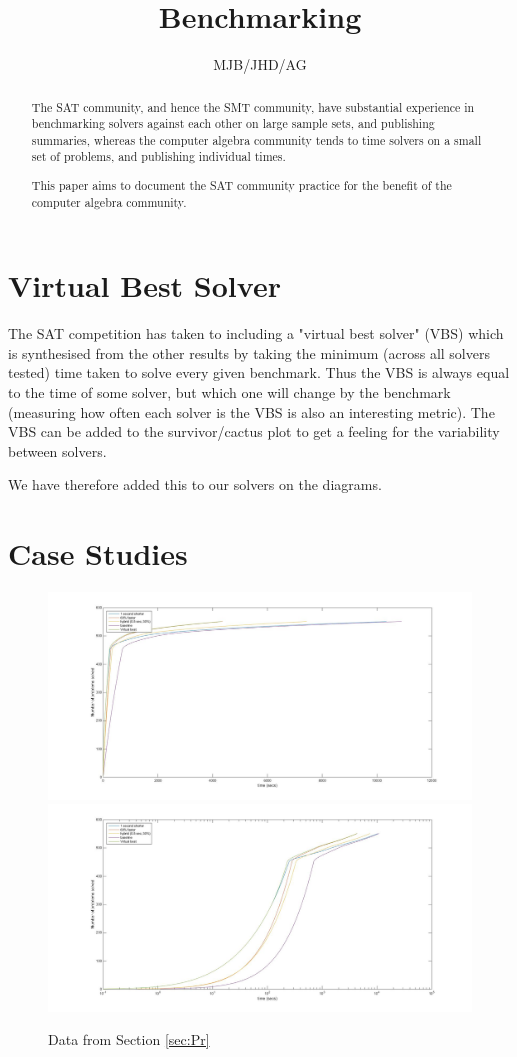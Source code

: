 \documentclass{article}
\begin{document}
\title{Benchmarking}
\author{MJB/JHD/AG}
\maketitle
\begin{abstract}\noindent
The SAT community, and hence the SMT community, have substantial experience in benchmarking solvers against each other on large sample sets, and publishing summaries, whereas the computer algebra community tends to time solvers on a small set of problems, and publishing individual times.
\par
This paper aims to document the SAT community practice for the benefit of the computer algebra community.
\end{abstract}

\section{Virtual Best Solver}
The SAT competition has taken to including a "virtual best solver" (VBS)
which is synthesised from the other results by taking the minimum (across all solvers tested) time taken to solve every given benchmark.
Thus the VBS is always equal to the time of some solver, but which one will change by the benchmark (measuring how often each solver is the VBS is also an interesting metric).  The VBS can be added to the survivor/cactus plot to get a feeling for the variability between solvers.
\par
We have therefore added this to our solvers on the diagrams.
\section{Case Studies}
\begin{figure}[h]
\caption{Data from Section \ref{sec:Pr}\label{Fig:S2}}
\includegraphics[scale=0.25]{Fig2a.jpg}
\includegraphics[scale=0.25]{Fig2b.jpg}
\end{figure}
\end{document}
